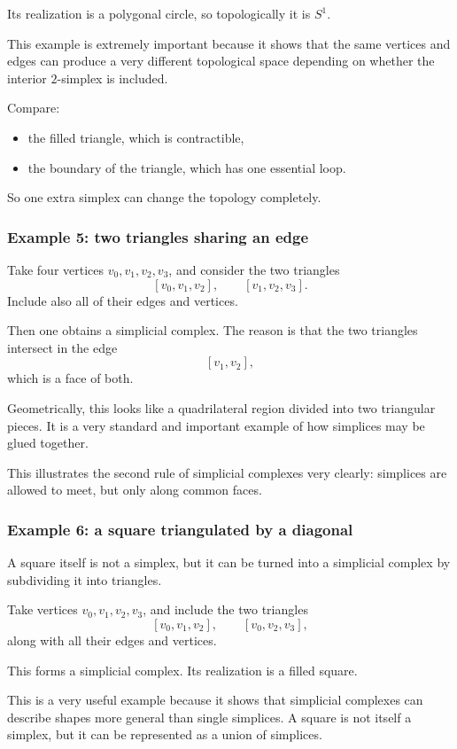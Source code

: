 \documentclass[12pt,a4paper]{article}
\theoremstyle{notespace}
\begin{document}
Its realization is a polygonal circle, so topologically it is \(S^1\).

This example is extremely important because it shows that the same vertices and edges can produce a very different topological space depending on whether the interior \(2\)-simplex is included.

Compare:
\begin{itemize}
	\item the filled triangle, which is contractible,
	\item the boundary of the triangle, which has one essential loop.
\end{itemize}

So one extra simplex can change the topology completely.

\subsubsection{Example 5: two triangles sharing an edge}

Take four vertices \(v_0,v_1,v_2,v_3\), and consider the two triangles
\[
[v_0,v_1,v_2],
\qquad
[v_1,v_2,v_3].
\]
Include also all of their edges and vertices.

Then one obtains a simplicial complex. The reason is that the two triangles intersect in the edge
\[
[v_1,v_2],
\]
which is a face of both.

Geometrically, this looks like a quadrilateral region divided into two triangular pieces. It is a very standard and important example of how simplices may be glued together.

This illustrates the second rule of simplicial complexes very clearly: simplices are allowed to meet, but only along common faces.

\subsubsection{Example 6: a square triangulated by a diagonal}

A square itself is not a simplex, but it can be turned into a simplicial complex by subdividing it into triangles.

Take vertices \(v_0,v_1,v_2,v_3\), and include the two triangles
\[
[v_0,v_1,v_2],
\qquad
[v_0,v_2,v_3],
\]
along with all their edges and vertices.

This forms a simplicial complex. Its realization is a filled square.

This is a very useful example because it shows that simplicial complexes can describe shapes more general than single simplices. A square is not itself a simplex, but it can be represented as a union of simplices.
\end{document}
